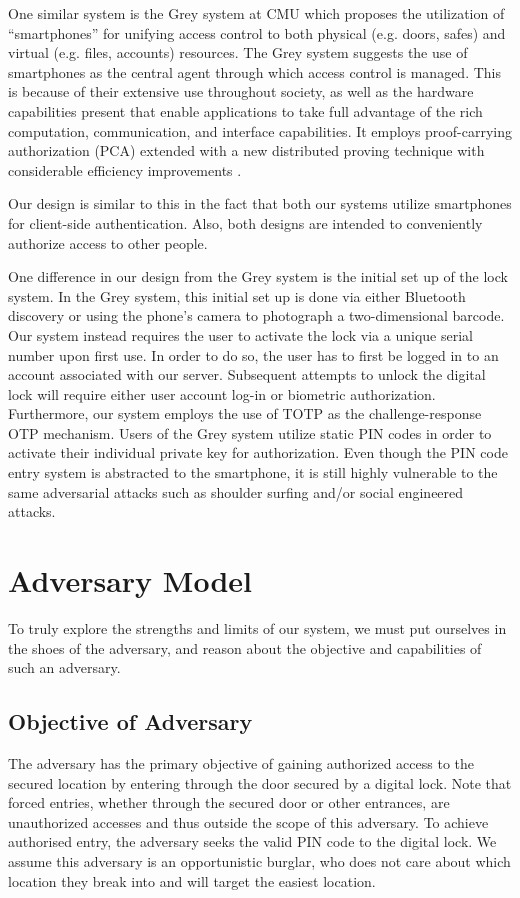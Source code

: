 \documentclass[conference]{IEEEtran}
\begin{document}
	One similar system is the Grey system at CMU which proposes the utilization of “smartphones” for unifying access control to both physical (e.g. doors, safes) and virtual (e.g. files, accounts) resources. The Grey system suggests the use of smartphones as the central agent through which access control is managed. This is because of their extensive use throughout society, as well as the hardware capabilities present that enable applications to take full advantage of the rich computation, communication, and interface capabilities. It employs proof-carrying authorization (PCA) \cite{ab8} extended with a new distributed proving technique with considerable efficiency improvements \cite{ab9}. 
	
	Our design is similar to this in the fact that both our systems utilize smartphones for client-side authentication. Also, both designs are intended to conveniently authorize access to other people. 

	One difference in our design from the Grey system is the initial set up of the lock system. In the Grey system, this initial set up is done via either Bluetooth discovery or using the phone’s camera to photograph a two-dimensional barcode. Our system instead requires the user to activate the lock via a unique serial number upon first use. In order to do so, the user has to first be logged in to an account associated with our server. Subsequent attempts to unlock the digital lock will require either user account log-in or biometric authorization. Furthermore, our system employs the use of TOTP as the challenge-response OTP mechanism. Users of the Grey system utilize static PIN codes in order to activate their individual private key for authorization. Even though the PIN code entry system is abstracted to the smartphone, it is still highly vulnerable to the same adversarial attacks such as shoulder surfing and/or social engineered attacks.

\section{Adversary Model}
To truly explore the strengths and limits of our system, we must put ourselves in the shoes of the adversary, and reason about the objective and capabilities of such an adversary.
\subsection{Objective of Adversary}
The adversary has the primary objective of gaining authorized access to the secured location by entering through the door secured by a digital lock. Note that forced entries, whether through the secured door or other entrances, are unauthorized accesses and thus outside the scope of this adversary. To achieve authorised entry, the adversary seeks the valid PIN code to the digital lock. We assume this adversary is an opportunistic burglar, who does not care about which location they break into and will target the easiest location.
\end{document}
